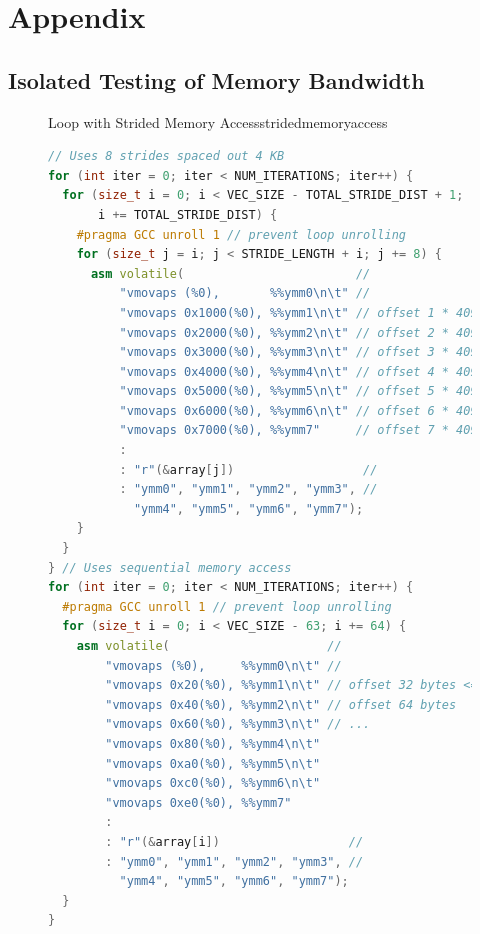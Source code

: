 \chapter{Appendix}
\label{chapter:appendix}
\section{Isolated Testing of Memory Bandwidth}
\label{section:stridedmembwtest}
\begin{figure}[h]
  \begin{algorithm}{Loop with Strided Memory Access}{stridedmemoryaccess}
    \begin{lstlisting}[language=C++,basicstyle=\scriptsize\ttfamily,showstringspaces=false]
// Uses 8 strides spaced out 4 KB
for (int iter = 0; iter < NUM_ITERATIONS; iter++) {
  for (size_t i = 0; i < VEC_SIZE - TOTAL_STRIDE_DIST + 1;
       i += TOTAL_STRIDE_DIST) {
    #pragma GCC unroll 1 // prevent loop unrolling
    for (size_t j = i; j < STRIDE_LENGTH + i; j += 8) {
      asm volatile(                        //
          "vmovaps (%0),       %%ymm0\n\t" //
          "vmovaps 0x1000(%0), %%ymm1\n\t" // offset 1 * 4096 bytes
          "vmovaps 0x2000(%0), %%ymm2\n\t" // offset 2 * 4096 bytes
          "vmovaps 0x3000(%0), %%ymm3\n\t" // offset 3 * 4096 bytes
          "vmovaps 0x4000(%0), %%ymm4\n\t" // offset 4 * 4096 bytes
          "vmovaps 0x5000(%0), %%ymm5\n\t" // offset 5 * 4096 bytes
          "vmovaps 0x6000(%0), %%ymm6\n\t" // offset 6 * 4096 bytes
          "vmovaps 0x7000(%0), %%ymm7"     // offset 7 * 4096 bytes
          :
          : "r"(&array[j])                  //
          : "ymm0", "ymm1", "ymm2", "ymm3", //
            "ymm4", "ymm5", "ymm6", "ymm7");
    }
  }
} // Uses sequential memory access
for (int iter = 0; iter < NUM_ITERATIONS; iter++) {
  #pragma GCC unroll 1 // prevent loop unrolling
  for (size_t i = 0; i < VEC_SIZE - 63; i += 64) {
    asm volatile(                      //
        "vmovaps (%0),     %%ymm0\n\t" //
        "vmovaps 0x20(%0), %%ymm1\n\t" // offset 32 bytes <=> 1 AVX2 vector
        "vmovaps 0x40(%0), %%ymm2\n\t" // offset 64 bytes
        "vmovaps 0x60(%0), %%ymm3\n\t" // ...
        "vmovaps 0x80(%0), %%ymm4\n\t"
        "vmovaps 0xa0(%0), %%ymm5\n\t"
        "vmovaps 0xc0(%0), %%ymm6\n\t"
        "vmovaps 0xe0(%0), %%ymm7"
        :
        : "r"(&array[i])                  //
        : "ymm0", "ymm1", "ymm2", "ymm3", //
          "ymm4", "ymm5", "ymm6", "ymm7");
  }
}
    \end{lstlisting}
  \end{algorithm}
\end{figure}
